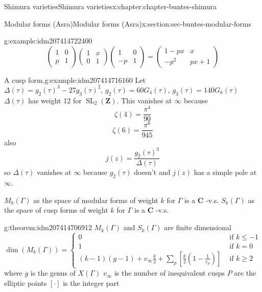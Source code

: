 \documentclass[oneside,10pt,]{book}
\numberwithin{equation}{section}
\newcommand{\lb}{[}
\newcommand{\rb}{]}
\newcommand{\ZZ}{\mathbf{Z}}
\newcommand{\CC}{\mathbf{C}}
\DeclareMathOperator{\SL}{SL}
\newcommand{\amp}{&}
\begin{document}
\begin{chapterptx}{Shimura varieties}{}{Shimura varieties}{}{}{x:chapter:chapter-buntes-shimura}
\begin{sectionptx}{Modular forms (Asra)}{}{Modular forms (Asra)}{}{}{x:section:sec-buntes-modular-forms}
\begin{example}{}{g:example:idm207414722400}
\begin{equation*}
\begin{pmatrix} 1\amp 0 \\ p \amp 1 \end{pmatrix} \begin{pmatrix} 1\amp x \\ 0 \amp 1 \end{pmatrix} \begin{pmatrix} 1\amp 0 \\ -p \amp 1 \end{pmatrix}  = \begin{pmatrix} 1 - px \amp x  \\ -p^2 \amp px+ 1 \end{pmatrix}
\end{equation*}
%
\end{example}
\begin{example}{A cusp form.}{g:example:idm207414716160}%
Let \(\Delta(\tau) = g_2(\tau)^3 - 27g_3(\tau)^2,\,g_2(\tau) = 60G_4(\tau),\,g_3(\tau) =140G_6(\tau)\) \(\Delta(\tau)\) has weight 12 for \(\SL_2(\ZZ)\). This vanishes at \(\infty\) because%
\begin{equation*}
\zeta(4) = \frac{\pi^4}{90}
\end{equation*}
%
\begin{equation*}
\zeta(6) = \frac{\pi^6}{945}
\end{equation*}
also%
\begin{equation*}
j(z) = \frac{g_2(\tau)^3}{\Delta(\tau)}
\end{equation*}
so \(\Delta(\tau)\) vanishes at \(\infty\) because \(g_2(\tau)\) doesn't  and \(j(z)\) has a  simple pole at \(\infty\).%
\end{example}
\(M_k(\Gamma)\) as the space of modular forms of weight \(k\) for \(\Gamma\) is a \(\CC\) -v.s. \(S_k(\Gamma)\) as the space of cusp forms of weight \(k\) for \(\Gamma\) is a \(\CC\) -v.s.%
\begin{theorem}{}{}{g:theorem:idm207414706912}%
\(M_k(\Gamma)\) and \(S_k(\Gamma)\) are finite dimensional%
\begin{equation*}
\dim(M_k(\Gamma)) =
\begin{cases}
0 \amp \text{ if } k \le -1\\
1 \amp \text{ if } k = 0\\
(k-1)(g-1) + v_\infty \frac k2 + \sum_p [\frac k2 (1- \frac{1}{e_p})] \amp \text{ if } k \ge 2
\end{cases}
\end{equation*}
where \(g\) is the genus of \(X(\Gamma)\) \(v_\infty\) is the number of inequivalent cusps \(P\) are the elliptic points \(\lb \cdot \rb\) is the integer part%

\end{theorem}
\end{sectionptx}
\end{chapterptx}
\end{document}
